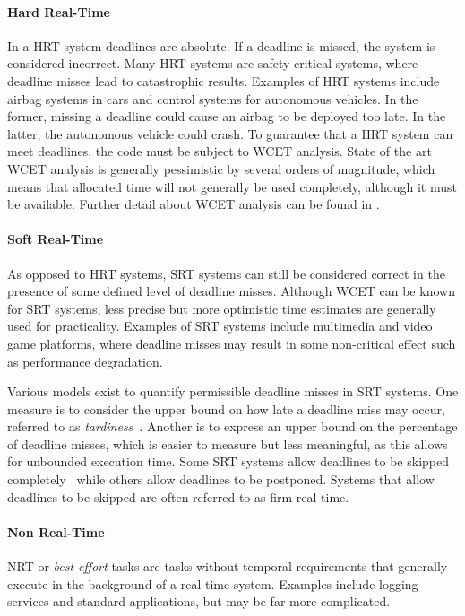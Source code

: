 \paragraph{Hard Real-Time}
In a \gls{HRT} system deadlines are absolute.
If a deadline is missed, the system is considered incorrect.
Many \gls{HRT} systems are safety-critical systems, where deadline misses lead to catastrophic results.
Examples of \gls{HRT} systems include airbag systems in cars and control systems for autonomous vehicles.
In the former, missing a deadline could cause an airbag to be deployed too late.
In the latter, the autonomous vehicle could crash.
To guarantee that a \gls{HRT} system can meet deadlines, the code must be subject to {\gls{WCET}} analysis. State of the art {\gls{WCET}} analysis is generally pessimistic by several orders of magnitude, which means that allocated time will not generally be used completely, although it must be available.
Further detail about {\gls{WCET}} analysis can be found in \citet{Lv_GZDYZ_09}.

\paragraph{Soft Real-Time}
As opposed to \gls{HRT} systems, \gls{SRT} systems can still be considered correct in the presence of some defined level of deadline misses. Although {\gls{WCET}} can be known for {\gls{SRT}} systems, less precise but more optimistic time estimates are generally used for practicality.
Examples of \gls{SRT} systems include multimedia and video game platforms, where deadline misses may result in some non-critical effect such as performance degradation.

Various models exist to quantify permissible deadline misses in \gls{SRT} systems.
One measure is to consider the upper bound on how late a deadline miss may occur, referred to as \emph{tardiness}~\citep{Devi:phd}.
Another is to express an upper bound on the percentage of deadline misses, which is easier to measure but less meaningful, as this allows for unbounded execution time.
Some \gls{SRT} systems allow deadlines to be skipped completely~\citep{Koren_Shasha_1995} while others allow deadlines to be postponed. Systems that allow deadlines to be skipped are often referred to as firm real-time.

\paragraph{Non Real-Time}
\Gls{NRT} or \emph{best-effort} tasks are tasks without temporal requirements that generally execute in the background of a real-time system. Examples include logging services and standard applications, but may be far more complicated.

